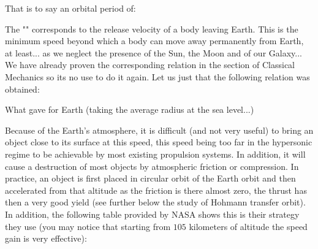 	That is to say an orbital period of:
	
	
	The "" corresponds to the release velocity of a body leaving Earth. This is the minimum speed beyond which a body can move away permanently from Earth, at least... as we neglect the presence of the Sun, the Moon and of our Galaxy... We have already proven the corresponding relation in the section of Classical Mechanics so its no use to do it again. Let us just that the following relation was obtained:
	
	What gave for Earth (taking the average radius at the sea level...)
	
	
	Because of the Earth's atmosphere, it is difficult (and not very useful) to bring an object close to its surface at this speed, this speed being too far in the hypersonic regime to be achievable by most existing propulsion systems. In addition, it will cause a destruction of most objects by atmospheric friction or compression. In practice, an object is first placed in circular orbit of the Earth orbit and then accelerated from that altitude as the friction is there almost zero, the thrust has then a very good yield (see further below the study of Hohmann transfer orbit). In addition, the following table provided by NASA shows this is their strategy they use (you may notice that starting from $105$ kilometers of altitude the speed gain is very effective):
